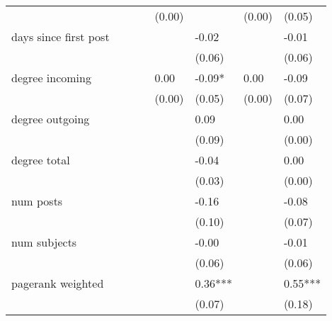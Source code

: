 \begin{table*}
\begin{center}
\begin{tabular}{llllllll}
                                                 &          &            &         & (0.00)  &              & (0.00)             & (0.05)   \\
days since first post                      &          &            &         &         & -0.02        &                    & -0.01    \\
                                                 &          &            &         &         & (0.06)       &                    & (0.06)   \\
degree incoming                            &          &            &         & 0.00    & -0.09*       & 0.00               & -0.09    \\
                                                 &          &            &         & (0.00)  & (0.05)       & (0.00)             & (0.07)   \\
degree outgoing                            &          &            &         &         & 0.09         &                    & 0.00     \\
                                                 &          &            &         &         & (0.09)       &                    & (0.00)   \\
degree total                               &          &            &         &         & -0.04        &                    & 0.00     \\
                                                 &          &            &         &         & (0.03)       &                    & (0.00)   \\
num posts                                  &          &            &         &         & -0.16        &                    & -0.08    \\
                                                 &          &            &         &         & (0.10)       &                    & (0.07)   \\
num subjects                               &          &            &         &         & -0.00        &                    & -0.01    \\
                                                 &          &            &         &         & (0.06)       &                    & (0.06)   \\
pagerank weighted                          &          &            &         &         & 0.36***      &                    & 0.55***  \\
                                                 &          &            &         &         & (0.07)       &                    & (0.18)   \\

\end{tabular}
\end{center}
\end{table*}
